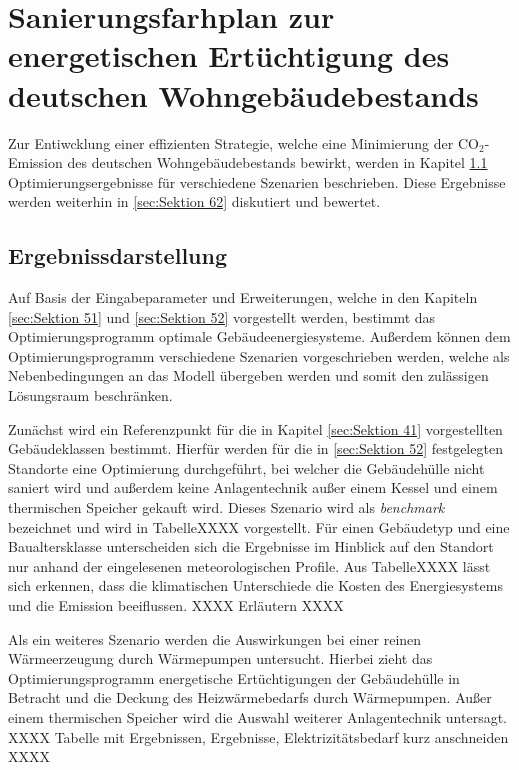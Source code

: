 \chapter{Sanierungsfarhplan zur energetischen Ertüchtigung des deutschen Wohngebäudebestands}

Zur Entiwcklung einer effizienten Strategie, welche eine Minimierung der CO\(_2\)-Emission des deutschen Wohngebäudebestands bewirkt, werden in Kapitel \ref{sec:Sektion 61}  Optimierungsergebnisse für verschiedene Szenarien beschrieben.
Diese Ergebnisse werden weiterhin in \ref{sec:Sektion 62} diskutiert und bewertet.

\section{Ergebnissdarstellung}
\label{sec:Sektion 61}

Auf Basis der Eingabeparameter und Erweiterungen, welche in den Kapiteln \ref{sec:Sektion 51} und \ref{sec:Sektion 52} vorgestellt werden, bestimmt das Optimierungsprogramm optimale Gebäudeenergiesysteme.
Außerdem können dem Optimierungsprogramm verschiedene Szenarien vorgeschrieben werden, welche als Nebenbedingungen an das Modell übergeben werden und somit den zulässigen Lösungsraum beschränken.

Zunächst wird ein Referenzpunkt für die in Kapitel \ref{sec:Sektion 41} vorgestellten Gebäudeklassen bestimmt.
Hierfür werden für die in \ref{sec:Sektion 52} festgelegten Standorte eine Optimierung durchgeführt, bei welcher die Gebäudehülle nicht saniert wird und außerdem keine Anlagentechnik außer einem Kessel und einem thermischen Speicher gekauft wird.
Dieses Szenario wird als \textit{benchmark} bezeichnet und wird in TabelleXXXX vorgestellt.
Für einen Gebäudetyp und eine Baualtersklasse unterscheiden sich die Ergebnisse im Hinblick auf den Standort nur anhand der eingelesenen meteorologischen Profile.
Aus TabelleXXXX lässt sich erkennen, dass die klimatischen Unterschiede die Kosten des Energiesystems und die Emission beeiflussen. XXXX Erläutern XXXX

Als ein weiteres Szenario werden die Auswirkungen bei einer reinen Wärmeerzeugung durch Wärmepumpen untersucht.
Hierbei zieht das Optimierungsprogramm energetische Ertüchtigungen der Gebäudehülle in Betracht und die Deckung des Heizwärmebedarfs durch Wärmepumpen.
Außer einem thermischen Speicher wird die Auswahl weiterer Anlagentechnik untersagt.
XXXX Tabelle mit Ergebnissen, Ergebnisse, Elektrizitätsbedarf kurz anschneiden XXXX

